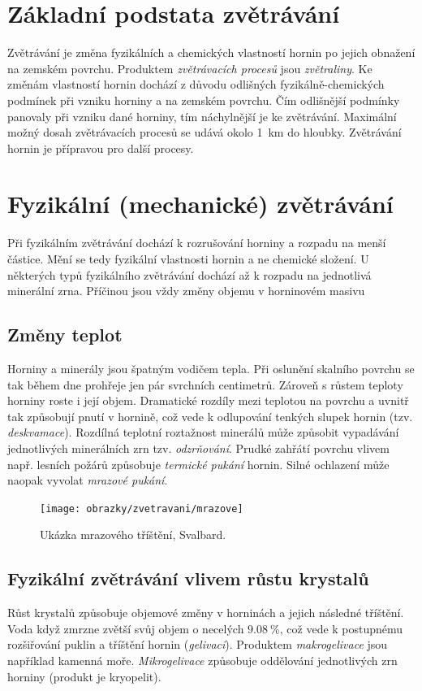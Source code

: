 \section{Základní podstata zvětrávání}
Zvětrávání je změna fyzikálních a chemických vlastností hornin po jejich obnažení na zemském povrchu. Produktem \emph{zvětrávacích procesů} jsou \emph{zvětraliny}. Ke změnám vlastností hornin dochází z důvodu odlišných fyzikálně-chemických podmínek při vzniku horniny a na zemském povrchu. Čím odlišnější podmínky panovaly při vzniku dané horniny, tím náchylnější je ke zvětrávání. Maximální možný dosah zvětrávacích procesů se udává okolo \SI{1}{\kilo\metre} do hloubky. Zvětrávání hornin je přípravou pro další procesy.

\section{Fyzikální (mechanické) zvětrávání}
Při fyzikálním zvětrávání dochází k rozrušování horniny a rozpadu na menší částice. Mění se tedy fyzikální vlastnosti hornin a ne chemické složení. U některých typů fyzikálního zvětrávání dochází až k rozpadu na jednotlivá minerální zrna. Příčinou jsou vždy změny objemu v horninovém masivu

\subsection{Změny teplot}
Horniny a minerály jsou špatným vodičem tepla. Při oslunění skalního povrchu se tak během dne prohřeje jen pár svrchních centimetrů. Zároveň s růstem teploty horniny roste i její objem. Dramatické rozdíly mezi teplotou na povrchu a uvnitř tak způsobují pnutí v hornině, což vede k odlupování tenkých slupek hornin (tzv. \emph{deskvamace}). Rozdílná teplotní roztažnost minerálů může způsobit vypadávání jednotlivých minerálních zrn tzv. \emph{odzrňování}. Prudké zahřátí povrchu vlivem např. lesních požárů způsobuje \emph{termické pukání} hornin. Silné ochlazení může naopak vyvolat \emph{mrazové pukání}.

\begin{figure}
	\centering
	\texttt{[image: obrazky/zvetravani/mrazove]}
	\caption{Ukázka mrazového tříštění, Svalbard.}
	\label{fig:mrazove}
\end{figure}

\subsection{Fyzikální zvětrávání vlivem růstu krystalů}
Růst krystalů způsobuje objemové změny v horninách a jejich následné tříštění. Voda když zmrzne zvětší svůj objem o necelých $\SI{9,08}{\percent}$, což vede k postupnému rozšiřování puklin a tříštění hornin (\emph{gelivaci}). Produktem \emph{makrogelivace} jsou například kamenná moře. \emph{Mikrogelivace} způsobuje oddělování jednotlivých zrn horniny (produkt je kryopelit).


